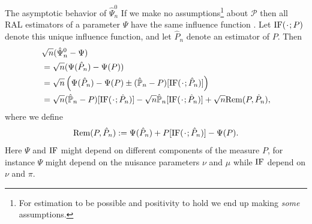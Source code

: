 \documentclass[smaller]{beamer}\usepackage{listings}
\begin{document}
\begin{frame}[label={sec:org80db992}]{The asymptotic behavior of \(\hat\Psi_n^0\)}
\small If we make no assumptions\footnote{For estimation to be possible and positivity to hold we end up making \emph{some} assumptions.} about \(\mathcal{P}\) then all RAL estimators of a parameter
\(\Psi\) have the same influence function \citep{kennedy2016semiparametric}. Let \(\ic(\blank;P)\) denote this
unique influence function, and let \(\hat P_n\) denote an estimator of \(P\). Then
\begin{align*}
  & \sqrt{n}(\hat{\Psi}_n^0 - \Psi)
  \\
  & = \sqrt{n}
    (\Psi(\hat P_n) - \Psi(P))
  \\
  &  = \sqrt{n}
    \left(
    \Psi(\hat P_n) - \Psi(P)
    \pm
    (\empmeas-P)[\ic(\blank; \hat P_n)]
    \right)
  \\
  &  = \sqrt{n}(\empmeas-P)[\ic(\blank; \hat P_n)]
    - \sqrt{n}\empmeas[\ic(\blank; \hat P_n)]
    + \sqrt{n}\mathrm{Rem}(P,  \hat P_n),
\end{align*}
where we define
\begin{equation*}
  \mathrm{Rem}(P,  \hat{P}_n)
  := \Psi(\hat P_n) 
  + P[\ic(\blank; \hat P_n)]
  - \Psi(P).
\end{equation*}
Here \(\Psi\) and \(\mathrm{IF}\) might depend on different components of the measure \(P\), for instance \(\Psi\)
might depend on the nuisance parameters \(\nu\) and \(\mu\) while \(\mathrm{IF}\) depend on \(\nu\) and \(\pi\).
\end{frame}
\end{document}
